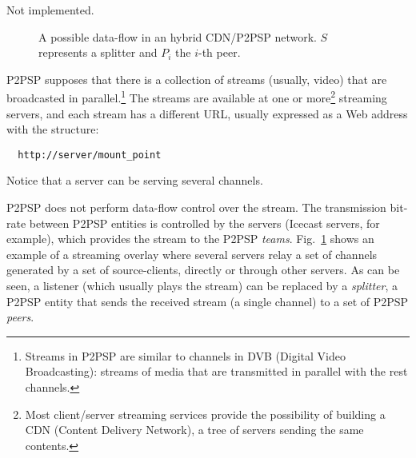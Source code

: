 

\label{sec:LBS}

\begin{note}
  Not implemented.
\end{note}

\begin{figure}
  \caption{A possible data-flow in an hybrid CDN/P2PSP
    network. $S$ represents a splitter and $P_i$ the $i$-th
    peer.} %
  \label{fig:icecast-P2PSP}
\end{figure}

P2PSP supposes that there is a collection of \glspl{stream} (usually,
video) that are broadcasted in parallel.\footnote{Streams in P2PSP are
  similar to channels in DVB (Digital Video Broadcasting): streams of
  media that are transmitted in parallel with the rest channels.}  The
\glspl{stream} are available at one or more\footnote{Most
  client/server streaming services provide the possibility of building
  a CDN (Content Delivery Network), a tree of servers sending the same
  contents.} streaming \glspl{server}, and each stream has a different
\acrlong{URL}, usually expressed as a Web address with the structure:
\begin{verbatim}
  http://server/mount_point
\end{verbatim}
Notice that a server can be serving several channels.

P2PSP does not perform data-flow control over the stream. The
transmission bit-rate between P2PSP entities is controlled by the
servers (Icecast servers, for example), which provides the stream to
the P2PSP \emph{teams}. Fig.~\ref{fig:icecast-P2PSP} shows an example
of a streaming overlay where several servers relay a set of channels
generated by a set of source-clients, directly or through other
servers. As can be seen, a listener (which usually plays the stream)
can be replaced by a \emph{splitter}, a P2PSP entity that sends the
received stream (a single channel) to a set of P2PSP \emph{peers}.


